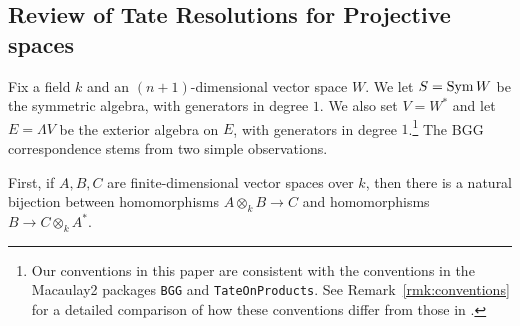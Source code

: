 \documentclass[twoside,12pt, leqno]{amsart}
\def\PP{{\mathbb P}}
\begin{document}

\subsection{Review of Tate Resolutions for Projective spaces}
Fix a field $k$ and an $(n+1)$-dimensional vector space $W$.  We let $S=\operatorname{Sym} W$ be the symmetric algebra, with generators in degree $1$.  We also set $V=W^*$ and let $E=\Lambda V$ be the exterior algebra on $E$, with generators in degree $1$.\footnote{Our conventions in this paper are consistent with the conventions in the Macaulay2 packages {\tt BGG} and {\tt TateOnProducts}.  See Remark~\ref{rmk:conventions} for a detailed comparison of how these conventions differ from those in \cite{EFS,EES}.}  The BGG correspondence stems from two simple observations.

First, if $A, B, C$ are finite-dimensional vector spaces over $k$, then there is a natural bijection between  homomorphisms $A\otimes_kB\to C$ and homomorphisms
$ B \to C\otimes_k A^*$.
\end{document}
